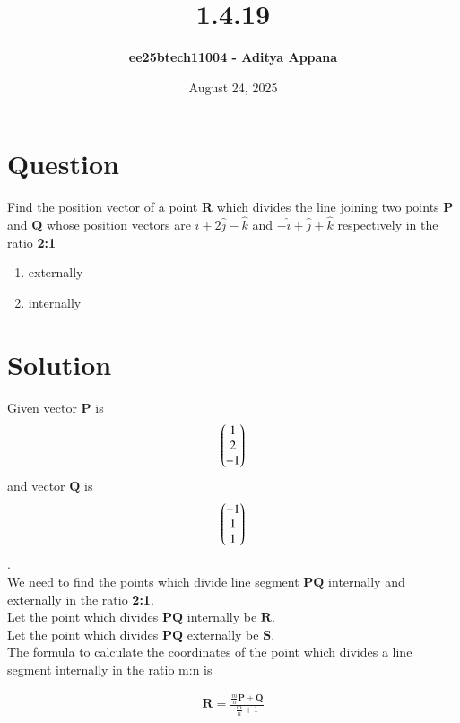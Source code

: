 \documentclass[12pt]{article}
\title{\textbf{1.4.19}}
\author{\textbf{ee25btech11004 - Aditya Appana}}
\date{August 24, 2025}
\begin{document}
\maketitle

\section{Question}


Find the position vector of a point \textbf{R} which divides the line joining two points \textbf{P} and \textbf{Q} whose position vectors are $ \hat{i} + 2\hat{j} - \hat{k}$ and $-\hat{i} + \hat{j} + \hat{k} $ respectively in the ratio \textbf{2:1}
\begin{enumerate}[label=(\alph*)]
    \item externally
    \item internally   
\end{enumerate}

\section{Solution}

Given vector $\mathbf{P}$ is \begin{align} \begin{pmatrix} 1 \\ 2\\ -1\end{pmatrix}\end{align} and vector $\mathbf{Q}$ is \begin{align}\begin{pmatrix} -1 \\ 1 \\ 1 \end{pmatrix}\end{align} . \\

We need to find the points which divide line segment $\mathbf{PQ}$ internally and externally in the ratio \textbf{2:1}. \\



Let the point which divides $\mathbf{PQ}$ internally be $\mathbf{R}$. \\

Let the point which divides $\mathbf{PQ}$ externally be $\mathbf{S}$. \\

The formula to calculate the coordinates of the point which divides a line segment internally in the ratio m:n is 



\begin{align}
    \mathbf{R}=\frac{\frac{m}{n}\mathbf{P}+\mathbf{Q}}{\frac{m}{n}+1}
\end{align}
\end{document}
